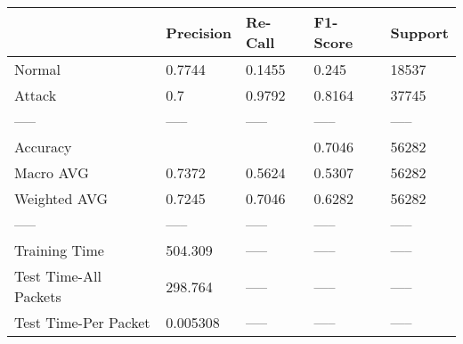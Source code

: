 \begin{tabular}{lllll}
\toprule
{} & Precision & Re-Call & F1-Score & Support \\
\midrule
Normal                &    0.7744 &  0.1455 &    0.245 &   18537 \\
Attack                &       0.7 &  0.9792 &   0.8164 &   37745 \\
-----                 &     ----- &   ----- &    ----- &   ----- \\
Accuracy              &           &         &   0.7046 &   56282 \\
Macro AVG             &    0.7372 &  0.5624 &   0.5307 &   56282 \\
Weighted AVG          &    0.7245 &  0.7046 &   0.6282 &   56282 \\
-----                 &     ----- &   ----- &    ----- &   ----- \\
Training Time         &   504.309 &   ----- &    ----- &   ----- \\
Test Time-All Packets &   298.764 &   ----- &    ----- &   ----- \\
Test Time-Per Packet  &  0.005308 &   ----- &    ----- &   ----- \\
\bottomrule
\end{tabular}
